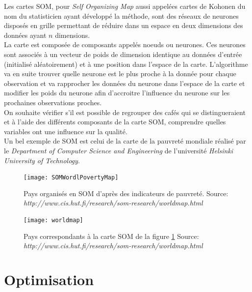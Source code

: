 Les cartes SOM, pour \textit{Self Organizing Map} aussi appelées cartes de Kohonen du nom du statisticien ayant développé la méthode, sont des réseaux de neurones disposés en grille permettant de réduire dans un espace en deux dimensions des données ayant $n$ dimensions.\\
 

\noindent La carte est composée de composants appelés noeuds ou neurones. Ces neurones sont associés à un vecteur de poids de dimension identique au données d'entrée (initialisé aléatoirement) et à une position dans l'espace de la carte. L'algorithme va en suite trouver quelle neurone est le plus proche à la donnée pour chaque observation et va rapprocher les données du neurone dans l'espace de la carte et modifier les poids du neurone afin d'accroitre l'influence du neurone sur les prochaines observations proches\cite{Kohonen:1988:SFT:65669.104428}.\\


\noindent On souhaite vérifier s'il est possible de regrouper des cafés qui se distingueraient et à l'aide des différents composants de la carte SOM, comprendre quelles variables ont une influence sur la qualité. \\
 

\noindent Un bel exemple de SOM est celui de la carte de la pauvreté mondiale réalisé par le \textit{Department of Computer Science and Engineering} de l'université \textit{Helsinki University of Technology}. 

\begin{figure}[H]
	\texttt{[image: SOMWordlPovertyMap]}
	\caption{\label{SOMPovertyMap} Pays organisés en SOM d'après des indicateurs de pauvreté. \newline Source: \textit{http://www.cis.hut.fi/research/som-research/worldmap.html}}
\end{figure}

\begin{figure}[H]
	\texttt{[image: worldmap]}
	\caption{\label{WorldPovertyMap} Pays correspondants à la carte SOM de la figure \ref{SOMPovertyMap} \newline Source: \textit{http://www.cis.hut.fi/research/som-research/worldmap.html}}
\end{figure}



\section{Optimisation}


